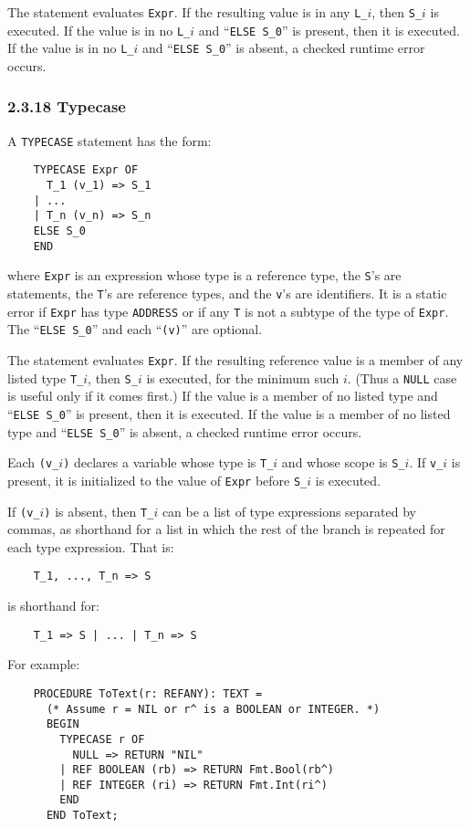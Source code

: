 \documentclass[10pt]{article}
\begin{document}
The statement evaluates \verb|Expr|.  If the resulting value is in any
\verb|L_|$i$, then \verb|S_|$i$ is executed.  If the value is in no
\verb|L_|$i$ and ``\verb|ELSE S_0|'' is present, then it is executed.  If the
value is in no \verb|L_|$i$ and ``\verb|ELSE S_0|'' is absent, a checked
runtime error occurs.

\subsubsection*{2.3.18 Typecase}

A \verb|TYPECASE| statement has the form:
\begin{verbatim}
    TYPECASE Expr OF
      T_1 (v_1) => S_1
    | ...
    | T_n (v_n) => S_n
    ELSE S_0
    END
\end{verbatim}
where \verb|Expr| is an expression whose type is a reference type, the
\verb|S|'s are statements, the \verb|T|'s are reference types, and the
\verb|v|'s are identifiers.  It is a static error if \verb|Expr| has type
\verb|ADDRESS| or if any \verb|T| is not a subtype of the type of \verb|Expr|.
The ``\verb|ELSE S_0|'' and each ``\verb|(v)|'' are optional.

The statement evaluates \verb|Expr|.  If the resulting reference value is a
member of any listed type \verb|T_|$i$, then \verb|S_|$i$ is executed, for the
minimum such $i$.  (Thus a \verb|NULL| case is useful only if it comes first.)
If the value is a member of no listed type and ``\verb|ELSE S_0|'' is present,
then it is executed.  If the value is a member of no listed type and
``\verb|ELSE S_0|'' is absent, a checked runtime error occurs.

Each \verb|(v_|$i$\verb|)| declares a variable whose type is \verb|T_|$i$ and
whose scope is \verb|S_|$i$.  If \verb|v_|$i$ is present, it is initialized to
the value of \verb|Expr| before \verb|S_|$i$ is executed.

If \verb|(v_|$i$\verb|)| is absent, then \verb|T_|$i$ can be a list of type
expressions separated by commas, as shorthand for a list in which the rest of
the branch is repeated for each type expression.  That is:
\begin{verbatim}
    T_1, ..., T_n => S
\end{verbatim}
is shorthand for:
\begin{verbatim}
    T_1 => S | ... | T_n => S
\end{verbatim}

For example:
\begin{verbatim}
    PROCEDURE ToText(r: REFANY): TEXT =
      (* Assume r = NIL or r^ is a BOOLEAN or INTEGER. *)
      BEGIN
        TYPECASE r OF
          NULL => RETURN "NIL"
        | REF BOOLEAN (rb) => RETURN Fmt.Bool(rb^)
        | REF INTEGER (ri) => RETURN Fmt.Int(ri^)
        END
      END ToText;
\end{verbatim}
\end{document}
